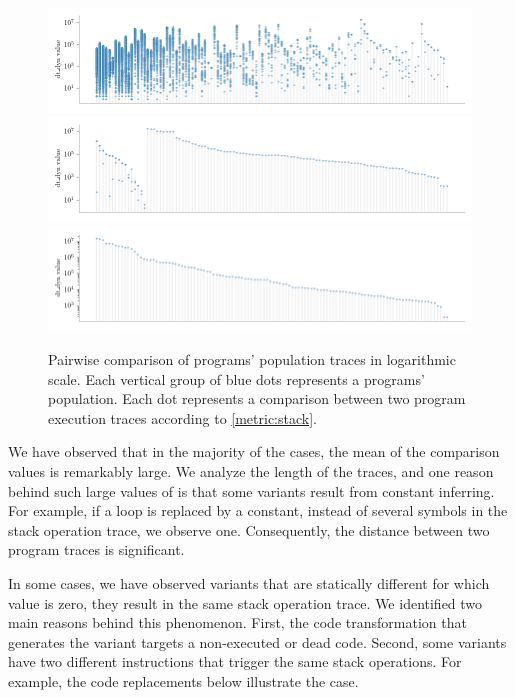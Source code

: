 \begin{figure}[h]
    \centering
    \includegraphics[width=\linewidth]{plots/plot_distribs1.png}
    \includegraphics[width=\linewidth]{plots/plot_distribs2.png}
    \includegraphics[width=\linewidth]{plots/plot_distribs3.png}
    \caption{Pairwise comparison of programs' population traces in logarithmic scale. Each vertical group of blue dots represents a programs' population. Each dot represents a comparison between two program execution traces according to \autoref{metric:stack}. }
    \label{rq2:dtw_distrib}
\end{figure}

We have observed that in the majority of the cases, the mean of the comparison values is remarkably large. We analyze the length of the traces, and one reason behind such large values of \DTW is that some variants result from constant inferring. For example, if a loop is replaced by a constant, instead of several symbols in the stack operation trace, we observe one. Consequently, the distance between two program traces is significant. 

In some cases, we have observed variants that are statically different for which \DTW value is zero, \ie they result in the same stack operation trace. We identified two main reasons behind this phenomenon. First, the code transformation that generates the variant targets a non-executed or dead code. Second, some variants have two different instructions that trigger the same stack operations. For example, the code replacements below illustrate the case. 

